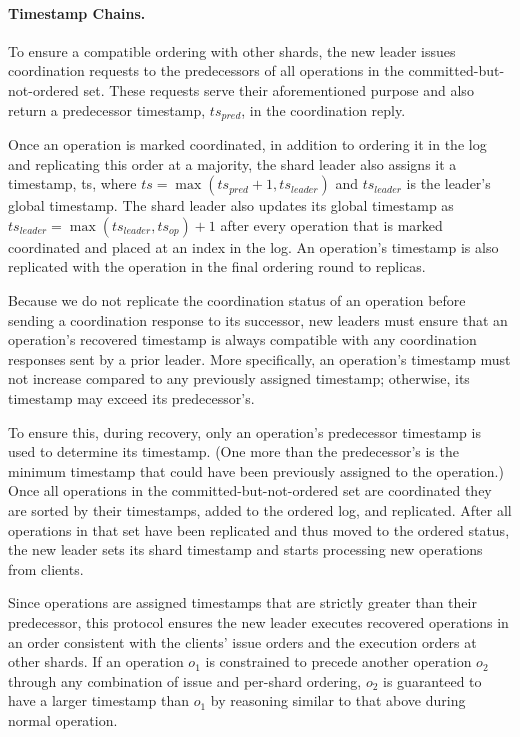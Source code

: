 \paragraph{Timestamp Chains.}
To ensure a compatible ordering with other shards, the new leader issues coordination requests to the predecessors of all operations in the committed-but-not-ordered set.
These requests serve their aforementioned purpose and also return a predecessor timestamp, $ts_{pred}$, in the coordination reply. 

Once an operation is marked coordinated, in addition to ordering it in the log and replicating this order at a majority, the shard leader also assigns it a timestamp, ts, where $ts = \max(ts_{pred} + 1, ts_{leader})$ and $ts_{leader}$ is the leader's global timestamp. The shard leader also updates its global timestamp as $ts_{leader} = \max(ts_{leader}, ts_{op}) + 1$ after every operation that is marked coordinated and placed at an index in the log. An operation's timestamp is also replicated with the operation in the final ordering round to replicas.

Because we do not replicate the coordination status of an operation before sending a coordination response to its successor, new leaders must ensure that an operation's recovered timestamp is always compatible with any coordination responses sent by a prior leader. More specifically, an operation's timestamp must not increase compared to any previously assigned timestamp; otherwise, its timestamp may exceed its predecessor's.

To ensure this, during recovery, only an operation's predecessor timestamp is used to determine its timestamp.
(One more than the predecessor's is the minimum timestamp that could have been previously assigned to the operation.) 
Once all operations in the committed-but-not-ordered set are coordinated they are sorted by their timestamps, added to the ordered log, and replicated.
After all operations in that set have been replicated and thus moved to the ordered status, the new leader sets its shard timestamp and starts processing new operations from clients.

Since operations are assigned timestamps that are strictly greater than their predecessor, this protocol ensures the new leader executes recovered operations
in an order consistent with the clients' issue orders and the execution orders at other shards. If an operation $o_1$ is constrained to precede another operation $o_2$ through any combination of issue and per-shard ordering, $o_2$
is guaranteed to have a larger timestamp than $o_1$ by reasoning similar to that above during normal operation. 

